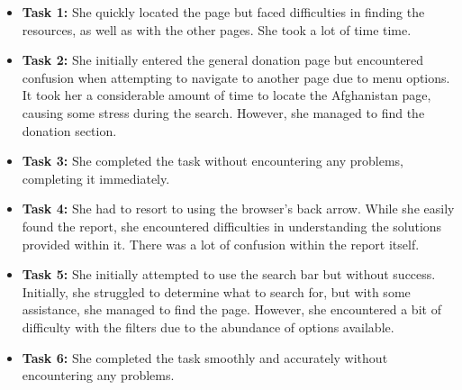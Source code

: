\begin{itemize}
    \item \textbf{Task 1:} She quickly located the page but faced difficulties in finding the resources, as well as with the other pages. She took a lot of time time.
    \item \textbf{Task 2:} She initially entered the general donation page but encountered confusion when attempting to navigate to another page due to menu options. It took her a considerable amount of time to locate the Afghanistan page, causing some stress during the search. However, she managed to find the donation section.
    \item \textbf{Task 3:} She completed the task without encountering any problems, completing it immediately.
    \item \textbf{Task 4:} She had to resort to using the browser's back arrow. While she easily found the report, she encountered difficulties in understanding the solutions provided within it. There was a lot of confusion within the report itself.
    \item \textbf{Task 5:} She initially attempted to use the search bar but without success. Initially, she struggled to determine what to search for, but with some assistance, she managed to find the page. However, she encountered a bit of difficulty with the filters due to the abundance of options available.
    \item \textbf{Task 6:} She completed the task smoothly and accurately without encountering any problems.
\end{itemize}





\vspace{1cm}

